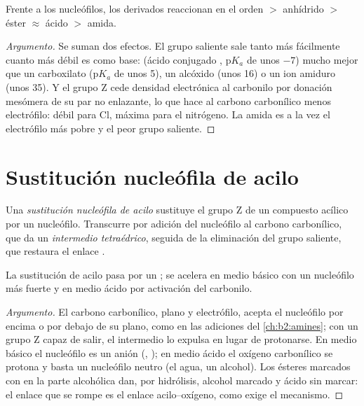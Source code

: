 \begin{proposition}\label{prop:b2:acyl-substitution:reactivity}
Frente a los nucleófilos, los derivados reaccionan en el orden  $>$ anhídrido $>$ éster
$\approx$ ácido $>$ amida.
\end{proposition}

\begin{proof}[Argumento]
Se suman dos efectos. El grupo saliente  sale tanto más fácilmente cuanto más débil es como base:
 (ácido conjugado , $\mathrm pK_a$ de unos $-7$) mucho mejor que un carboxilato
($\mathrm pK_a$ de unos 5), un alcóxido (unos 16) o un ion amiduro (unos 35). Y el grupo Z cede
densidad electrónica al carbonilo por donación mesómera de su par no enlazante, lo que hace al carbono
carbonílico menos electrófilo: débil para Cl, máxima para el nitrógeno. La amida es a la vez el electrófilo
más pobre y el peor grupo saliente.
\end{proof}

\section{Sustitución nucleófila de acilo}

\begin{definition}\label{def:b2:acyl-substitution:nas}
Una \emph{sustitución nucleófila de acilo} sustituye el grupo Z
de un compuesto acílico por un nucleófilo. Transcurre por adición del nucleófilo al carbono
carbonílico, que da un \emph{intermedio tetraédrico}, seguida de la
eliminación del grupo saliente, que restaura el enlace .
\end{definition}

\begin{proposition}\label{prop:b2:acyl-substitution:addition-elimination}
La sustitución de acilo pasa por un ; se acelera en medio básico con un nucleófilo
más fuerte y en medio ácido por activación del carbonilo.
\end{proposition}

\begin{proof}[Argumento]
El carbono carbonílico, plano y electrófilo, acepta el nucleófilo por encima o por debajo de su
plano, como en las adiciones del \cref{ch:b2:amines}; con un grupo Z capaz de salir, el intermedio
lo expulsa en lugar de protonarse. En medio básico el nucleófilo es un anión (,
); en medio ácido el oxígeno carbonílico se protona y basta un nucleófilo neutro (el agua, un
alcohol). Los ésteres marcados con  en la parte alcohólica dan, por hidrólisis, alcohol marcado
y ácido sin marcar: el enlace que se rompe es el enlace acilo--oxígeno, como exige el mecanismo.
\end{proof}

